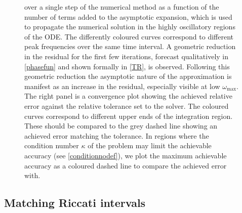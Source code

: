 \documentclass[10pt]{article}
\newcommand{\AB}[1]{{\color{orange}#1}}
\begin{document}
\begin{figure}[tb]
{    over a single step of the numerical method as a function of the number of
    terms added to the asymptotic expansion, which is used to propagate the
    numerical solution in the highly oscillatory regions of the ODE. The
    differently coloured curves correspond to different peak frequencies over
    the same time interval. A geometric reduction in the residual for the first
    few iterations, forecast qualitatively in \cref{phasefun} and shown formally in
    \cref{TR}, is observed. Following this geometric reduction the
    asymptotic nature of the approximation is manifest as an increase in the
    residual, especially visible at low $\omega_{\text{max}}$. The right panel
    is a convergence plot showing the achieved relative error against the
    relative tolerance set to the solver. The coloured curves correspond to
    different upper ends of the integration region. These should be compared to
    the grey dashed line showing an achieved error matching the tolerance.
    In regions where the condition number $\kappa$ of the problem may limit the achievable
    accuracy (see \cref{conditionnodef}), we plot the maximum achievable
    accuracy as a coloured dashed line to compare the achieved error with. }
\end{figure}



\subsection{Matching Riccati intervals}
\end{document}

